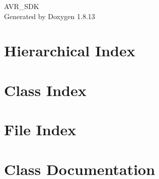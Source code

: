 \documentclass[twoside]{book}
\newcommand{\+}{\discretionary{\mbox{\scriptsize$\hookleftarrow$}}{}{}}
\newcommand{\clearemptydoublepage}{%
  \newpage{\pagestyle{empty}\cleardoublepage}%
}
\begin{document}
\hypersetup{pageanchor=false,
             bookmarksnumbered=true,
             pdfencoding=unicode
            }
\begin{titlepage}
\vspace*{7cm}
\begin{center}%
{\Large A\+V\+R\+\_\+\+S\+DK }\\
\vspace*{1cm}
{\large Generated by Doxygen 1.8.13}\\
\end{center}
\end{titlepage}
\clearemptydoublepage
{}
\tableofcontents
\clearemptydoublepage
{}
\hypersetup{pageanchor=true}

\chapter{Hierarchical Index}

\chapter{Class Index}

\chapter{File Index}

\chapter{Class Documentation}






















































\end{document}
